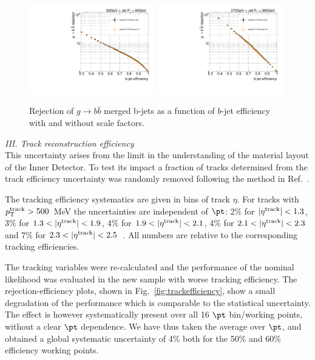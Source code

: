 \begin{figure}[tp]
\centering
\includegraphics[width=0.49\textwidth]{FIGS/systematics/LlhoodKDE_ISO_BTagCalibTest_rejvseff060.pdf}
\includegraphics[width=0.49\textwidth]{FIGS/systematics/LlhoodKDE_ISO_BTagCalibTest_rejvseff270.pdf}
\caption{Rejection of $g\rightarrow b \bar{b}$ merged b-jets as a function of $b$-jet efficiency with and without scale factors.}
\label{fig:btaggingSFsPerf}
\end{figure}

%

\vspace{3mm}
{ \em III. Track reconstruction efficiency}
\\[3mm]
This uncertainty arises from the limit in the understanding of the material layout of the Inner Detector. To test its impact a fraction of tracks determined from the track efficiency uncertainty was randomly removed following the method in Ref.~\cite{JetMassNote}.%

The tracking efficiency systematics are given in bins of track $\eta$. For tracks with $p_{\rm{T}}^{\rm{track}} > 500$~MeV the uncertainties are independent of $\pt$:  2\% for $|\eta^{\rm{track}}|<1.3$, 3\% for $1.3<|\eta^{\rm{track}}|<1.9$, 4\% for $1.9<|\eta^{\rm{track}}|<2.1$, 4\% for $2.1<|\eta^{\rm{track}}|<2.3$ and 7\% for $2.3<|\eta^{\rm{track}}|<2.5$~\cite{chargemultiplicity}. All numbers are relative to the corresponding tracking efficiencies.  

The tracking variables were re-calculated and the performance of the nominal likelihood was evaluated in the new sample with worse tracking efficiency. The rejection-efficiency plots, shown in Fig.~\ref{fig:trackefficiency}, show a small degradation of the performance which is comparable to the statistical uncertainty. The effect is however systematically present over all 16 $\pt$ bin/working points, without a clear $\pt$ dependence. We have thus taken the average over $\pt$, and obtained a global systematic uncertainty of 4\% both for the 50\% and 60\% efficiency working points.

